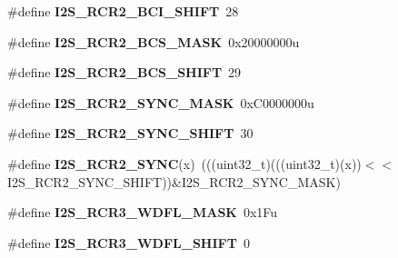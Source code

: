 \begin{DoxyCompactItemize}
\item 
\#define {\bfseries I2\+S\+\_\+\+R\+C\+R2\+\_\+\+B\+C\+I\+\_\+\+S\+H\+I\+FT}~28\hypertarget{group__I2S__Register__Masks_gae2c819f98fdcd09a87ed34dd47b5fb4b}{}\label{group__I2S__Register__Masks_gae2c819f98fdcd09a87ed34dd47b5fb4b}

\item 
\#define {\bfseries I2\+S\+\_\+\+R\+C\+R2\+\_\+\+B\+C\+S\+\_\+\+M\+A\+SK}~0x20000000u\hypertarget{group__I2S__Register__Masks_gae4983d1c1366069cf6e768f5fefe84ff}{}\label{group__I2S__Register__Masks_gae4983d1c1366069cf6e768f5fefe84ff}

\item 
\#define {\bfseries I2\+S\+\_\+\+R\+C\+R2\+\_\+\+B\+C\+S\+\_\+\+S\+H\+I\+FT}~29\hypertarget{group__I2S__Register__Masks_gaad737555e622d9b49f092a83f4e7ea85}{}\label{group__I2S__Register__Masks_gaad737555e622d9b49f092a83f4e7ea85}

\item 
\#define {\bfseries I2\+S\+\_\+\+R\+C\+R2\+\_\+\+S\+Y\+N\+C\+\_\+\+M\+A\+SK}~0x\+C0000000u\hypertarget{group__I2S__Register__Masks_gaf1a919e7fd69cca38a1454b2883fc0f0}{}\label{group__I2S__Register__Masks_gaf1a919e7fd69cca38a1454b2883fc0f0}

\item 
\#define {\bfseries I2\+S\+\_\+\+R\+C\+R2\+\_\+\+S\+Y\+N\+C\+\_\+\+S\+H\+I\+FT}~30\hypertarget{group__I2S__Register__Masks_ga9bb530a10a74f4c58a1866ba1d62fedd}{}\label{group__I2S__Register__Masks_ga9bb530a10a74f4c58a1866ba1d62fedd}

\item 
\#define {\bfseries I2\+S\+\_\+\+R\+C\+R2\+\_\+\+S\+Y\+NC}(x)~(((uint32\+\_\+t)(((uint32\+\_\+t)(x))$<$$<$I2\+S\+\_\+\+R\+C\+R2\+\_\+\+S\+Y\+N\+C\+\_\+\+S\+H\+I\+FT))\&I2\+S\+\_\+\+R\+C\+R2\+\_\+\+S\+Y\+N\+C\+\_\+\+M\+A\+SK)\hypertarget{group__I2S__Register__Masks_ga29dd6e89e4b93cd2ca8ce5af3ede012b}{}\label{group__I2S__Register__Masks_ga29dd6e89e4b93cd2ca8ce5af3ede012b}

\item 
\#define {\bfseries I2\+S\+\_\+\+R\+C\+R3\+\_\+\+W\+D\+F\+L\+\_\+\+M\+A\+SK}~0x1\+Fu\hypertarget{group__I2S__Register__Masks_gab98b46b5057b2fd18a0fefb93eb20450}{}\label{group__I2S__Register__Masks_gab98b46b5057b2fd18a0fefb93eb20450}

\item 
\#define {\bfseries I2\+S\+\_\+\+R\+C\+R3\+\_\+\+W\+D\+F\+L\+\_\+\+S\+H\+I\+FT}~0\hypertarget{group__I2S__Register__Masks_gaab28291891b0e5ced36d580cef82982d}{}\label{group__I2S__Register__Masks_gaab28291891b0e5ced36d580cef82982d}


\end{DoxyCompactItemize}
